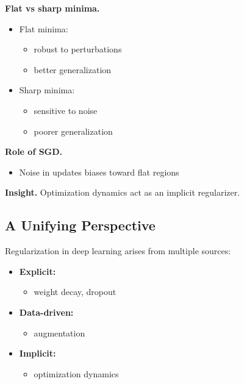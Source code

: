 \medskip

\noindent
\textbf{Flat vs sharp minima.}

\begin{itemize}
    \item Flat minima:
    \begin{itemize}
        \item robust to perturbations
        \item better generalization
    \end{itemize}

    \item Sharp minima:
    \begin{itemize}
        \item sensitive to noise
        \item poorer generalization
    \end{itemize}
\end{itemize}

\medskip

\noindent
\textbf{Role of SGD.}
\begin{itemize}
    \item Noise in updates biases toward flat regions
\end{itemize}

\medskip

\noindent
\textbf{Insight.}  
Optimization dynamics act as an implicit regularizer.

\subsection{A Unifying Perspective}

Regularization in deep learning arises from multiple sources:

\begin{itemize}
    \item \textbf{Explicit:}
    \begin{itemize}
        \item weight decay, dropout
    \end{itemize}

    \item \textbf{Data-driven:}
    \begin{itemize}
        \item augmentation
    \end{itemize}

    \item \textbf{Implicit:}
    \begin{itemize}
        \item optimization dynamics
    \end{itemize}
\end{itemize}

